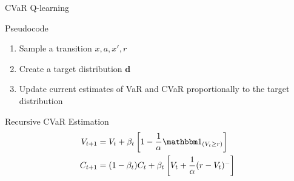 \documentclass{beamer}
\begin{document}

\begin{frame}{CVaR Q-learning}

\begin{block}{Pseudocode}
\begin{enumerate}
\item Sample a transition $x, a, x', r$
\item Create a target distribution $\mathbf{d}$

\item Update current estimates of VaR and CVaR proportionally to the target distribution

\end{enumerate}
\end{block}


\begin{block}{Recursive CVaR Estimation}
\begin{align*}
V_{t+1} &= V_{t} + \beta_t \bsquare{1-\dfrac{1}{\alpha}\indicator_{(V_t \ge r)}}\\
C_{t+1} &= (1-\beta_t)C_t + \beta_t \bsquare{V_t + \dfrac{1}{\alpha}(r-V_t)^-}
\end{align*}
\end{block}
\end{frame}


%
%
%
%
%    
%	
%


\end{document}
